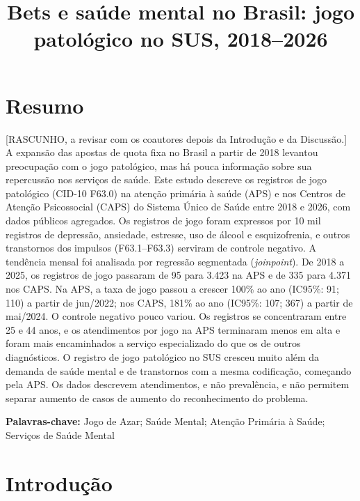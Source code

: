 \documentclass[12pt,a4paper]{article}
\title{Bets e saúde mental no Brasil: jogo patológico no SUS, 2018--2026}
\author{}
\date{}
\newcommand{\pendente}[1]{{\color{orange}[#1]}}
\begin{document}
\maketitle

\section*{Resumo}

\pendente{RASCUNHO, a revisar com os coautores depois da Introdução e da Discussão.} A expansão das apostas de quota fixa no Brasil a partir de 2018 levantou preocupação com o jogo patológico, mas há pouca informação sobre sua repercussão nos serviços de saúde. Este estudo descreve os registros de jogo patológico (CID-10 F63.0) na atenção primária à saúde (APS) e nos Centros de Atenção Psicossocial (CAPS) do Sistema Único de Saúde entre 2018 e 2026, com dados públicos agregados. Os registros de jogo foram expressos por 10 mil registros de depressão, ansiedade, estresse, uso de álcool e esquizofrenia, e outros transtornos dos impulsos (F63.1--F63.3) serviram de controle negativo. A tendência mensal foi analisada por regressão segmentada (\emph{joinpoint}). De 2018 a 2025, os registros de jogo passaram de 95 para 3.423 na APS e de 335 para 4.371 nos CAPS. Na APS, a taxa de jogo passou a crescer 100\% ao ano (IC95\%: 91; 110) a partir de jun/2022; nos CAPS, 181\% ao ano (IC95\%: 107; 367) a partir de mai/2024. O controle negativo pouco variou. Os registros se concentraram entre 25 e 44 anos, e os atendimentos por jogo na APS terminaram menos em alta e foram mais encaminhados a serviço especializado do que os de outros diagnósticos. O registro de jogo patológico no SUS cresceu muito além da demanda de saúde mental e de transtornos com a mesma codificação, começando pela APS. Os dados descrevem atendimentos, e não prevalência, e não permitem separar aumento de casos de aumento do reconhecimento do problema.

\noindent\textbf{Palavras-chave:} Jogo de Azar; Saúde Mental; Atenção Primária à Saúde; Serviços de Saúde Mental

\section{Introdução}
\end{document}
